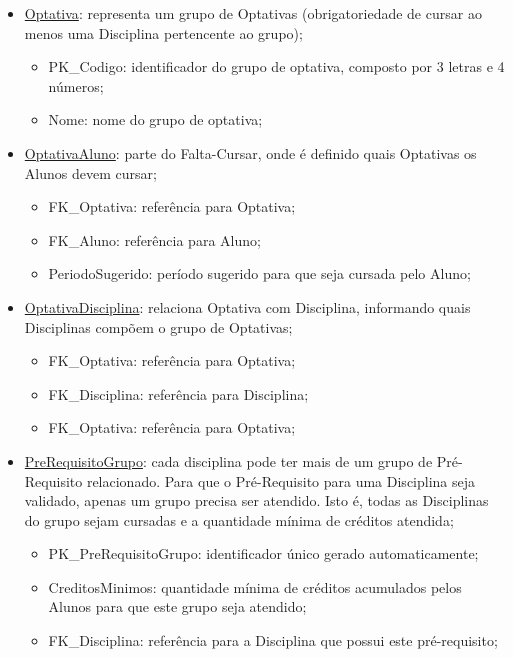 \documentclass[graduacao,brazil]{ThesisPUC}
\begin{document}
\begin{itemize}
	\item \underline{Optativa}: representa um grupo de Optativas (obrigatoriedade de cursar ao menos uma Disciplina pertencente ao grupo);
	\begin{itemize}
		\item PK\_Codigo: identificador do grupo de optativa, composto por 3 letras e 4 números;
		\item Nome: nome do grupo de optativa;
	\end{itemize}

	\item \underline{OptativaAluno}: parte do Falta-Cursar, onde é definido quais Optativas os Alunos devem cursar;
	\begin{itemize}
		\item FK\_Optativa: referência para Optativa;
		\item FK\_Aluno: referência para Aluno;
		\item PeriodoSugerido: período sugerido para que seja cursada pelo Aluno;
	\end{itemize}

	\item \underline{OptativaDisciplina}: relaciona Optativa com Disciplina, informando quais Disciplinas compõem o grupo de Optativas;
	\begin{itemize}
		\item FK\_Optativa: referência para Optativa;
		\item FK\_Disciplina: referência para Disciplina;
		\item FK\_Optativa: referência para Optativa;
	\end{itemize}

	\item \underline{PreRequisitoGrupo}: cada disciplina pode ter mais de um grupo de Pré-Requisito relacionado. Para que o Pré-Requisito para uma Disciplina seja validado, apenas um grupo precisa ser atendido. Isto é, todas as Disciplinas do grupo sejam cursadas e a quantidade mínima de créditos atendida;
	\begin{itemize}
		\item PK\_PreRequisitoGrupo: identificador único gerado automaticamente;
		\item CreditosMinimos: quantidade mínima de créditos acumulados pelos Alunos para que este grupo seja atendido;
		\item FK\_Disciplina: referência para a Disciplina que possui este pré-requisito;
	\end{itemize}


\end{itemize}
\end{document}
